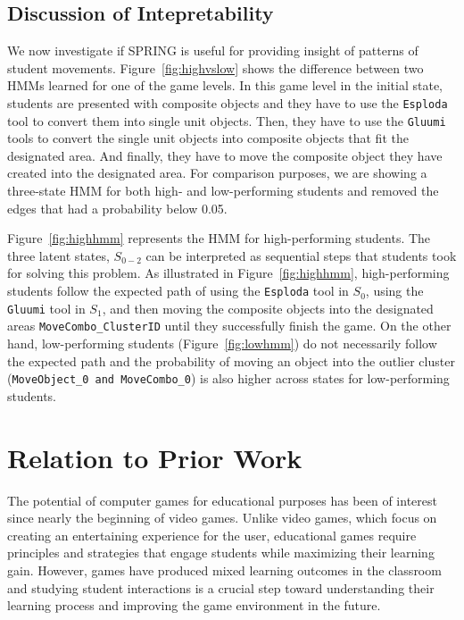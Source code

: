 \documentclass{sigchi}
\def\algname{SPRING\xspace}
\begin{document}
	\newpage
	\subsection{Discussion of Intepretability}

	We now investigate if \algname  is useful for  providing insight of patterns of student movements. 
	Figure~\ref{fig:highvslow} shows the difference between two HMMs learned for one of the game levels.
	In this game level in the initial state, students are presented with composite objects and they have to use the \texttt{Esploda} tool to convert them into single unit objects. 
	Then, they have to use the \texttt{Gluumi} tools to convert the single unit objects into composite objects that fit the designated area. 
	And finally, they have to move the composite object they have created into the designated area.
	For comparison purposes, we are showing a three-state HMM for both high- and low-performing students and removed the edges that had a probability below 0.05.
	
	Figure~\ref{fig:highhmm} represents the HMM for high-performing students. 
	The three latent states, $S_{0-2}$ can be interpreted as sequential steps that students took for solving this problem. As illustrated in Figure~\ref{fig:highhmm}, high-performing students follow the expected path of using the \texttt{Esploda} tool in $S_0$, using the \texttt{Gluumi} tool in $S_1$, and then moving the composite objects into the designated areas \texttt{MoveCombo\_{ClusterID}} until they successfully finish the game.
	On the other hand, low-performing students (Figure~\ref{fig:lowhmm}) do not necessarily follow the expected path and the probability of moving an object into the outlier cluster (\texttt{MoveObject\_0 and MoveCombo\_0}) is also higher across states for low-performing students.
	
	\section{Relation to Prior Work}
	\label{sec:priorwork}
	The potential of computer games for educational purposes has been of interest since nearly the beginning of video games. 
	Unlike video games, which focus on creating an entertaining experience for the user, educational games require principles and strategies that engage students while maximizing their learning gain. 
	However, games have produced mixed learning outcomes in the classroom \cite{harpstead2013search,mayo2009video} and studying student interactions is a crucial step toward understanding their learning process and improving the game environment in the future.
	
\end{document}

